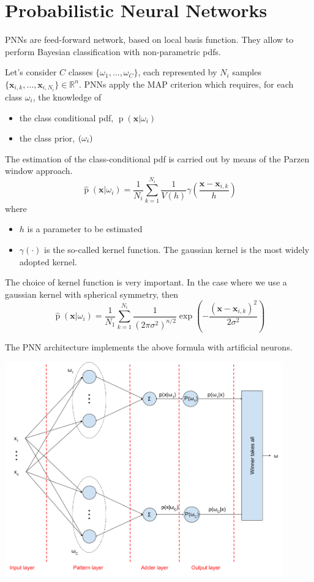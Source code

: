 \documentclass[oneside,onecolumn]{report}
\DeclareMathOperator*{\pdf}{p}
\let\P\relax
\DeclareMathOperator*{\P}{P}
\begin{document}
\section{Probabilistic Neural Networks}
PNNs are feed-forward network, based on local basis function.
They allow to perform Bayesian classification with non-parametric pdfs.

Let's consider $C$ classes $\{\omega_1, \dots, \omega_C\}$, each represented by $N_i$ samples $\{\bm x_{i,k}, \dots, \bm x_{i,N_i}\} \in \mathbb R^n$.
PNNs apply the MAP criterion which requires, for each class $\omega_i$, the knowledge of
\begin{itemize}
    \item the class conditional pdf, $\pdf(\bm x | \omega_i)$
    \item the class prior, $\P(\omega_i)$
\end{itemize}

The estimation of the class-conditional pdf is carried out by means of the Parzen window approach.
$$ \widehat{\pdf}(\bm x | \omega_i) = \frac{1}{N_i} \sum_{k = 1}^{N_i} \frac{1}{V(h)} \gamma\left( \frac{\bm x - \bm x_{i, k}}{h} \right) $$
where
\begin{itemize}
    \item $h$ is a parameter to be estimated
    \item $\gamma(\cdot)$ is the so-called kernel function.
    The gaussian kernel is the most widely adopted kernel.
\end{itemize}

The choice of kernel function is very important.
In the case where we use a gaussian kernel with spherical symmetry, then
$$ \widehat{\pdf}(\bm x | \omega_i) = \frac{1}{N_1} \sum_{k = 1}^{N_i} \frac{1}{(2 \pi \sigma^2)^{n/2}} \exp(-\frac{(\bm x - \bm x_{i,k})^2}{2 \sigma^2}) $$

The PNN architecture implements the above formula with artificial neurons.
\begin{center}
    \includegraphics[width=12cm]{probabilistic_neural_network.png}
\end{center}
\end{document}

